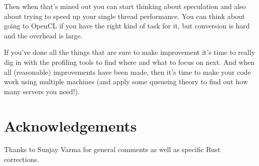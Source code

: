 Then when that's mined out you can start thinking about speculation and also about trying to speed up your single thread performance. You can think about going to OpenCL if you have the right kind of task for it, but conversion is hard and the overhead is large. 

If you've done all the things that are sure to make improvement it's time to really dig in with the profiling tools to find where and what to focus on next. And when all (reasonable) improvements have been made, then it's time to make your code work using multiple machines (and apply some queueing theory to find out how many servers you need!).

\section*{Acknowledgements} Thanks to Sunjay Varma for general comments as well as specific Rust corrections.




